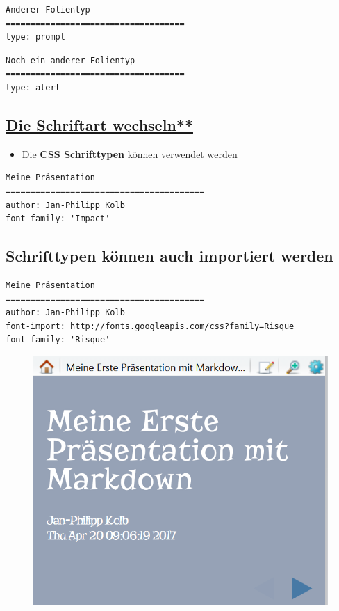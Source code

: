 \documentclass[]{article}
\providecommand{\tightlist}{%
  \setlength{\itemsep}{0pt}\setlength{\parskip}{0pt}}
\begin{document}
\begin{verbatim}
Anderer Folientyp
====================================
type: prompt
\end{verbatim}

\begin{verbatim}
Noch ein anderer Folientyp
====================================
type: alert
\end{verbatim}

\subsection{\texorpdfstring{\href{https://support.rstudio.com/hc/en-us/articles/200532307}{Die
Schriftart
wechseln**}}{Die Schriftart wechseln**}}\label{die-schriftart-wechseln}

\begin{itemize}
\tightlist
\item
  Die
  \href{https://www.w3schools.com/cssref/css_websafe_fonts.asp}{\textbf{CSS
  Schrifttypen}} können verwendet werden
\end{itemize}

\begin{verbatim}
Meine Präsentation
========================================
author: Jan-Philipp Kolb
font-family: 'Impact'
\end{verbatim}

\subsection{Schrifttypen können auch importiert
werden}\label{schrifttypen-konnen-auch-importiert-werden}

\begin{verbatim}
Meine Präsentation
========================================
author: Jan-Philipp Kolb
font-import: http://fonts.googleapis.com/css?family=Risque
font-family: 'Risque'
\end{verbatim}

\begin{figure}
\centering
\includegraphics{figure/SchriftartRisque.PNG}
\caption{}
\end{figure}
\end{document}
